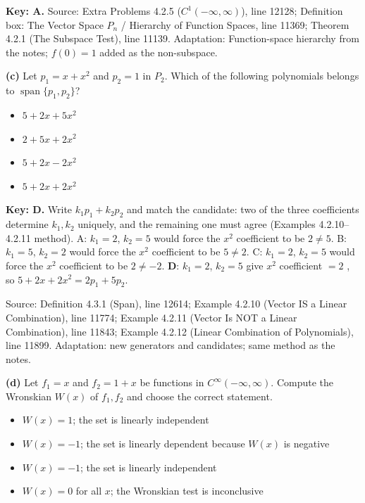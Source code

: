 \documentclass[11pt,a4paper]{article}
\newcommand{\Src}[1]{{\footnotesize\color{black!65}Source: #1}}
\begin{document}
\textbf{Key: A.} \Src{Extra Problems 4.2.5 ($C^1(-\infty,\infty)$), line 12128; Definition box: The Vector Space $P_n$ / Hierarchy of Function Spaces, line 11369; Theorem 4.2.1 (The Subspace Test), line 11139. Adaptation: Function-space hierarchy from the notes; $f(0)=1$ added as the non-subspace.}\par
{}\textbf{(c)} Let $p_1=x+x^{2}$ and $p_2=1$ in $P_2$. Which of the following polynomials belongs to $\operatorname{span}\{p_1,p_2\}$?\par
\begin{itemize}[leftmargin=8mm,itemsep=0pt]\item[A] $5+2x+5x^{2}$\item[B] $2+5x+2x^{2}$\item[C] $5+2x-2x^{2}$\item[D$^{\ast}$] $5+2x+2x^{2}$\end{itemize}
\textbf{Key: D.} Write $k_1p_1+k_2p_2$ and match the candidate: two of the three coefficients determine $k_1,k_2$ uniquely, and the remaining one must agree (Examples 4.2.10--4.2.11 method). A: $k_1=2$, $k_2=5$ would force the $x^{2}$ coefficient to be $2\neq5$. B: $k_1=5$, $k_2=2$ would force the $x^{2}$ coefficient to be $5\neq2$. C: $k_1=2$, $k_2=5$ would force the $x^{2}$ coefficient to be $2\neq-2$. \textbf{D}: $k_1=2$, $k_2=5$ give $x^{2}$ coefficient $=2$ \checkmark, so $5+2x+2x^{2}=2p_1+5p_2$.\par
\Src{Definition 4.3.1 (Span), line 12614; Example 4.2.10 (Vector IS a Linear Combination), line 11774; Example 4.2.11 (Vector Is NOT a Linear Combination), line 11843; Example 4.2.12 (Linear Combination of Polynomials), line 11899. Adaptation: new generators and candidates; same method as the notes.}\par
{}\textbf{(d)} Let $f_1=x$ and $f_2=1+x$ be functions in $C^{\infty}(-\infty,\infty)$. Compute the Wronskian $W(x)$ of $f_1,f_2$ and choose the correct statement.\par
\begin{itemize}[leftmargin=8mm,itemsep=0pt]\item[A] $W(x)=1$; the set is linearly independent\item[B] $W(x)=-1$; the set is linearly dependent because $W(x)$ is negative\item[C$^{\ast}$] $W(x)=-1$; the set is linearly independent\item[D] $W(x)=0$ for all $x$; the Wronskian test is inconclusive\end{itemize}
\end{document}
